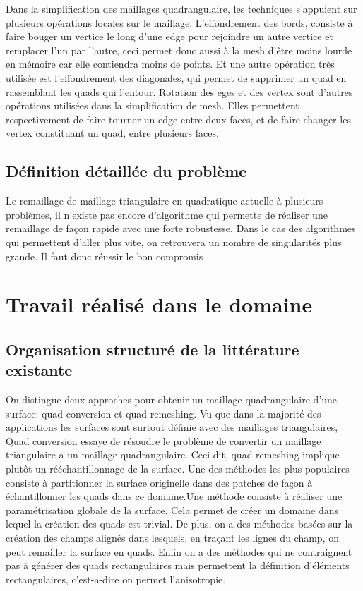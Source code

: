 \documentclass[runningheads]{llncs}
\begin{document}
Dans la simplification des maillages quadrangulaire, les techniques s'appuient sur plusieurs opérations locales sur le maillage. L'effondrement des bords, consiste à faire bouger un vertice le long d’une edge pour rejoindre un autre vertice et remplacer l’un par l’autre, ceci permet donc aussi à la mesh d'être moins lourde en mémoire car elle contiendra moins de points. Et une autre opération très utilisée est l'effondrement des diagonales, qui permet de supprimer un quad en rassemblant les quads qui l’entour.
Rotation des eges et des vertex sont d'autres opérations utilisées dans la simplification de mesh. Elles permettent respectivement de faire tourner un edge entre deux faces, et de faire changer les vertex constituant un quad, entre plusieurs faces.

\subsection{Définition détaillée du problème}
 Le remaillage de maillage triangulaire en quadratique actuelle à plusieurs problèmes, il n’existe pas encore d’algorithme qui permette de réaliser une remaillage de façon rapide avec une forte robustesse. Dans le cas des algorithmes qui permettent d’aller plus vite, on retrouvera un nombre de singularités plus grande. Il faut donc réussir le bon compromis 

\section{Travail réalisé dans le domaine}
\subsection{Organisation structuré de la littérature existante}
On distingue deux approches pour obtenir un maillage quadrangulaire d’une surface: quad conversion et quad remeshing. Vu que dans la majorité des applications les surfaces sont surtout définie avec des maillages triangulaires, Quad conversion essaye de résoudre le problème de convertir un maillage triangulaire a un maillage quadrangulaire. Ceci-dit, quad remeshing implique plutôt un rééchantillonnage de la surface. Une des méthodes les plus populaires consiste à partitionner la surface originelle dans des patches de façon à échantillonner les quads dans ce domaine.Une méthode consiste à réaliser une paramétrisation globale de la surface. Cela permet de créer un domaine dans lequel la création des quads est trivial. De plus, on a des méthodes basées sur la création des champs alignés dans lesquels, en traçant les lignes du champ, on peut remailler la surface en quads. Enfin on a des méthodes qui ne contraignent pas à générer des quads rectangulaires mais permettent la définition d'éléments rectangulaires, c’est-a-dire on permet l'anisotropie.
\end{document}
